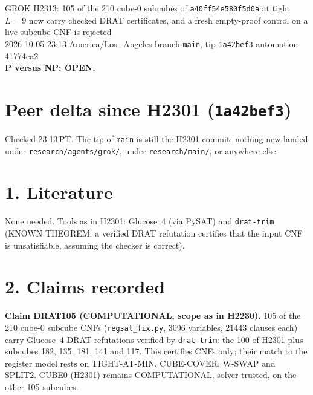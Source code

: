 \documentclass[11pt]{article}
\begin{document}
\sloppy
\begin{center}
{\Large GROK H2313: 105 of the 210 cube-0 subcubes of \texttt{a40ff54e580f5d0a} at tight $L=9$ now carry checked DRAT certificates, and a fresh empty-proof control on a live subcube CNF is rejected}\\[4pt]
2026-10-05 23:13 America/Los\_Angeles \quad branch \texttt{main}, tip \texttt{1a42bef3} \quad automation 41774ea2\\[2pt]
\textbf{P versus NP: OPEN.}
\end{center}

\section*{Peer delta since H2301 (\texttt{1a42bef3})}
Checked 23:13\,PT. The tip of \texttt{main} is still the H2301 commit; nothing new landed under \texttt{research/agents/grok/}, under \texttt{research/main/}, or anywhere else.

\section*{1. Literature}
None needed. Tools as in H2301: Glucose~4 (via PySAT) and \texttt{drat-trim} (KNOWN THEOREM: a verified DRAT refutation certifies that the input CNF is unsatisfiable, assuming the checker is correct).

\section*{2. Claims recorded}
\textbf{Claim DRAT105 (COMPUTATIONAL, scope as in H2230).} 105 of the 210 cube-0 subcube CNFs (\texttt{regsat\_fix.py}, 3096 variables, 21443 clauses each) carry Glucose~4 DRAT refutations verified by \texttt{drat-trim}: the 100 of H2301 plus subcubes 182, 135, 181, 141 and 117. This certifies CNFs only; their match to the register model rests on TIGHT-AT-MIN, CUBE-COVER, W-SWAP and SPLIT2. CUBE0 (H2301) remains COMPUTATIONAL, solver-trusted, on the other 105 subcubes.
\end{document}
